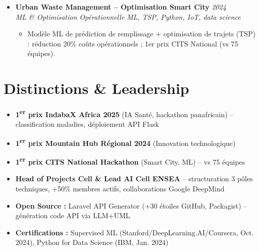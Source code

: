 \documentclass[a4paper,11pt]{article}
\begin{document}
\begin{itemize}[leftmargin=*, label={-}]
    \item \textbf{Urban Waste Management -- Optimisation Smart City} \hfill \textit{2024} \\
    \textit{ML \& Optimisation Op\'erationnelle} \hfill \textit{ML, TSP, Python, IoT, data science}
    \vspace{-2pt}
    \begin{itemize}[leftmargin=0.4cm, nosep, label=\tiny$\bullet$]
        \item \small{Modèle ML de prédiction de remplissage + optimisation de trajets (TSP) : réduction 20\% coûts opérationnels ; 1er prix CITS National (vs 75 équipes).}
    \end{itemize}
    \vspace{3pt}

\end{itemize}

\section{Distinctions \& Leadership}
\begin{itemize}[leftmargin=*, label=\tiny$\bullet$, nosep]
    \item \small{\textbf{1\textsuperscript{er} prix IndabaX Africa 2025} (IA Santé, hackathon panafricain) -- classification maladies, déploiement API Flask}
    \item \small{\textbf{1\textsuperscript{er} prix Mountain Hub Régional 2024} (Innovation technologique)}
    \item \small{\textbf{1\textsuperscript{er} prix CITS National Hackathon} (Smart City, ML) -- vs 75 équipes}
    \item \small{\textbf{Head of Projects Cell \& Lead AI Cell ENSEA} -- structuration 3 pôles techniques, +50\% membres actifs, collaborations Google DeepMind}
    \item \small{\textbf{Open Source :} Laravel API Generator (+30 étoiles GitHub, Packagist) -- génération code API via LLM+UML}
    \item \small{\textbf{Certifications :} Supervised ML (Stanford/DeepLearning.AI/Coursera, Oct. 2024), Python for Data Science (IBM, Jan. 2024)}
\end{itemize}
\end{document}
